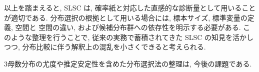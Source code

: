 以上を踏まえると, SLSC は, 確率紙と対応した直感的な診断量として用いることが適切である.
分布選択の根拠として用いる場合には, 標本サイズ, 標準変量の定義, \Xsp 空間と \Ssp 空間の違い, および候補分布群への依存性を明示する必要がある.
このような整理を行うことで, 従来の実務で蓄積されてきた SLSC の知見を活かしつつ, 分布比較に伴う解釈上の混乱を小さくできると考えられる.

3母数分布の尤度や推定安定性を含めた分布選択法の整理は, 今後の課題である.
